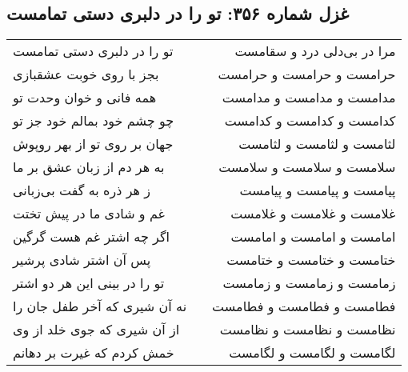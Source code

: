 \begin{center}
\section*{غزل شماره ۳۵۶: تو را در دلبری دستی تمامست}
\label{sec:0356}
\begin{longtable}{l p{0.5cm} r}
تو را در دلبری دستی تمامست
&&
مرا در بی‌دلی درد و سقامست
\\
بجز با روی خوبت عشقبازی
&&
حرامست و حرامست و حرامست
\\
همه فانی و خوان وحدت تو
&&
مدامست و مدامست و مدامست
\\
چو چشم خود بمالم خود جز تو
&&
کدامست و کدامست و کدامست
\\
جهان بر روی تو از بهر روپوش
&&
لثامست و لثامست و لثامست
\\
به هر دم از زبان عشق بر ما
&&
سلامست و سلامست و سلامست
\\
ز هر ذره به گفت بی‌زبانی
&&
پیامست و پیامست و پیامست
\\
غم و شادی ما در پیش تختت
&&
غلامست و غلامست و غلامست
\\
اگر چه اشتر غم هست گرگین
&&
امامست و امامست و امامست
\\
پس آن اشتر شادی پرشیر
&&
ختامست و ختامست و ختامست
\\
تو را در بینی این هر دو اشتر
&&
زمامست و زمامست و زمامست
\\
نه آن شیری که آخر طفل جان را
&&
فطامست و فطامست و فطامست
\\
از آن شیری که جوی خلد از وی
&&
نظامست و نظامست و نظامست
\\
خمش کردم که غیرت بر دهانم
&&
لگامست و لگامست و لگامست
\\
\end{longtable}
\end{center}
